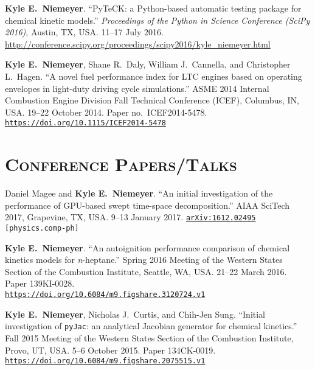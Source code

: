 \documentclass[margin,line,11pt]{res}
\makeatletter
\newlength{\bibhang}
\newlength{\bibsep}
 {\@listi \global\bibsep\itemsep \global\advance\bibsep by\parsep}
\newenvironment{bibenum*}
  {\renewcommand\labelenumi{\theenumi.}%
   \etaremune[
     topsep=0pt,
     itemsep=\bibsep,
     parsep=0pt,partopsep=0pt,
     itemindent=-\bibhang,
     leftmargin={\bibhang+\widthof{[999]}}]}
  {\endetaremune}
\newcommand*{\doi}[1]{\href{https://doi.org/#1}{\nolinkurl{https://doi.org/#1}}}
\makeatother
\begin{document}
\begin{resume}
\begin{bibenum*}
\item \textbf{Kyle E.\ Niemeyer}.
``PyTeCK: a Python-based automatic testing package for chemical kinetic models.''
\emph{Proceedings of the  Python in Science Conference (SciPy 2016)},
Austin, TX, USA.
11--17 July 2016.
\url{http://conference.scipy.org/proceedings/scipy2016/kyle_niemeyer.html}

\item \textbf{Kyle E.\ Niemeyer}, Shane R.\ Daly, William J.\ Cannella, and Christopher L.\ Hagen.
``A novel fuel performance index for LTC engines based on operating envelopes in light-duty driving cycle simulations.''
ASME 2014 Internal Combustion Engine Division Fall Technical Conference (ICEF), Columbus, IN, USA.
19--22 October 2014.
Paper no.~ICEF2014-5478.
\doi{10.1115/ICEF2014-5478}

\end{bibenum*}

\section{\textsc{Conference Papers\slash Talks}}

\begin{bibenum*}

\item Daniel Magee and \textbf{Kyle E.\ Niemeyer}. ``An initial investigation of the performance of GPU-based swept time-space decomposition.''
AIAA SciTech 2017, Grapevine, TX, USA.
9--13 January 2017.
{\tt \href{http://arxiv.org/abs/1612.02495}{arXiv:1612.02495} [physics.comp-ph]}

\item \textbf{Kyle E.\ Niemeyer}. ``An autoignition performance comparison of chemical kinetics models for \emph{n}-heptane.''
Spring 2016 Meeting of the Western States Section of the Combustion Institute, Seattle, WA, USA.
21--22 March 2016.
Paper 139KI-0028. \\
\doi{10.6084/m9.figshare.3120724.v1}

\item \textbf{Kyle E.\ Niemeyer}, Nicholas J.\ Curtis, and Chih-Jen Sung. ``Initial investigation of \texttt{pyJac}: an analytical Jacobian generator for chemical kinetics.''
Fall 2015 Meeting of the Western States Section of the Combustion Institute, Provo, UT, USA.
5--6 October 2015.
Paper 134CK-0019.
\doi{10.6084/m9.figshare.2075515.v1}


\end{bibenum*}
\end{resume}
\end{document}
